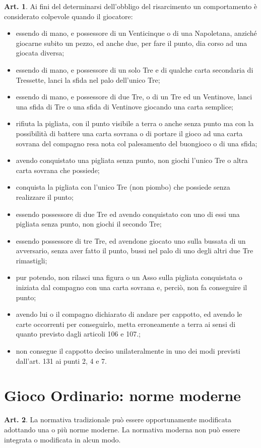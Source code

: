 \documentclass[italian,a4paper]{article}
\theoremstyle{definition}
\newtheorem{art}{Art.}
\begin{document}
\begin{art}
Ai fini del determinarsi dell'obbligo del risarcimento un comportamento è considerato colpevole quando il giocatore:
\begin{itemize}
\item  essendo di mano, e possessore di un Venticinque o di una Napoletana, anziché giocarne subito un pezzo, ed anche due, per fare il punto, dia corso ad una giocata diversa;
\item  essendo di mano, e possessore di un solo Tre e di qualche carta secondaria di Tressette, lanci la sfida nel palo dell'unico Tre;
\item  essendo di mano, e possessore di due Tre, o di un Tre ed un Ventinove, lanci una sfida di Tre o una sfida di Ventinove giocando una carta semplice;
\item  rifiuta la pigliata, con il punto visibile a terra o anche senza punto ma con la possibilità di battere una carta sovrana o di portare il gioco ad una carta sovrana del compagno resa nota col palesamento del buongioco o di una sfida;
\item  avendo conquistato una pigliata senza punto, non giochi l'unico Tre o altra carta sovrana che possiede;
\item  conquista la pigliata con l'unico Tre (non piombo) che possiede senza realizzare il punto;
\item  essendo possessore di due Tre ed avendo conquistato con uno di essi una pigliata senza punto, non giochi il secondo Tre;
\item  essendo possessore di tre Tre, ed avendone giocato uno sulla bussata di un avversario, senza aver fatto il punto, bussi nel palo di uno degli altri due Tre rimastigli;
\item  pur potendo, non rilasci una figura o un Asso sulla pigliata conquistata o iniziata dal compagno con una carta sovrana e, perciò, non fa conseguire il punto;
\item              avendo lui o il compagno dichiarato di andare per cappotto, ed avendo le carte occorrenti per conseguirlo, metta erroneamente a terra ai sensi di quanto previsto dagli articoli 106 e 107.;
\item             non consegue il cappotto deciso unilateralmente in uno dei modi previsti dall'art. 131 ai punti 2, 4 e 7.
    \end{itemize}
\end{art}
\section{Gioco Ordinario: norme moderne}
\begin{art}
La normativa tradizionale può essere opportunamente modificata adottando una o più norme moderne.
La normativa moderna non può essere integrata o modificata in alcun modo.
\end{art}
\end{document}
